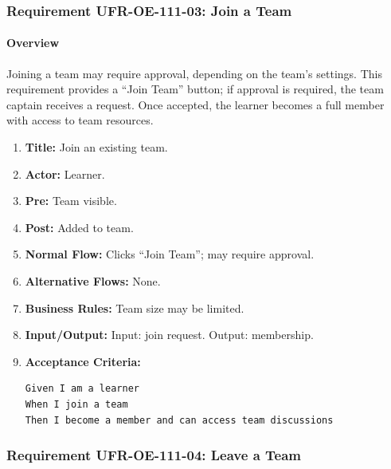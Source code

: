 \subsubsection{Requirement UFR-OE-111-03: Join a Team}
\paragraph{Overview}
Joining a team may require approval, depending on the team’s settings. This requirement provides a “Join Team” button; if approval is required, the team captain receives a request. Once accepted, the learner becomes a full member with access to team resources.
\begin{enumerate}[label=\textbf{\arabic*.}]
\item \textbf{Title:} Join an existing team.
\item \textbf{Actor:} Learner.
\item \textbf{Pre:} Team visible.
\item \textbf{Post:} Added to team.
\item \textbf{Normal Flow:} Clicks “Join Team”; may require approval.
\item \textbf{Alternative Flows:} None.
\item \textbf{Business Rules:} Team size may be limited.
\item \textbf{Input/Output:} Input: join request. Output: membership.
\item \textbf{Acceptance Criteria:}
    \begin{verbatim}
Given I am a learner
When I join a team
Then I become a member and can access team discussions
    \end{verbatim}
\end{enumerate}

\subsubsection{Requirement UFR-OE-111-04: Leave a Team}
